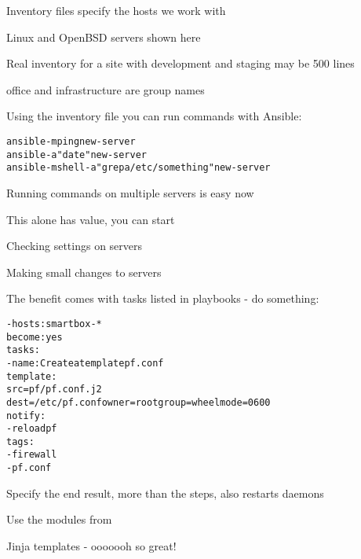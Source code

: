 \documentclass[18pt,landscape,a4paper,footrule]{foils}
\begin{document}
\begin{list2}
\item Inventory files specify the hosts we work with
\item Linux and OpenBSD servers shown here
\item Real inventory for a site with development and staging may be 500 lines
\item office and infrastructure are group names
\end{list2}



Using the inventory file you can run commands with Ansible:

\begin{alltt}\footnotesize
  ansible -m ping new-server
  ansible -a "date" new-server
  ansible -m shell -a "grep a /etc/something" new-server
\end{alltt}

\begin{list2}
\item Running commands on multiple servers is easy now
\item This alone has value, you can start
\item Checking settings on servers
\item Making small changes to servers
\end{list2}



The benefit comes with tasks listed in playbooks - do something:

\begin{alltt}\footnotesize
  - hosts: smartbox-*
    become: yes
    tasks:
    - name: Create a template pf.conf
      template:
        src=pf/pf.conf.j2
        dest=/etc/pf.conf owner=root group=wheel mode=0600
     notify:
        - reload pf
      tags:
        - firewall
        - pf.conf
\end{alltt}

\begin{list2}
\item Specify the end result, more than the steps, also restarts daemons
\item Use the modules from\\
\item Jinja templates - ooooooh so great!
\end{list2}
\end{document}
